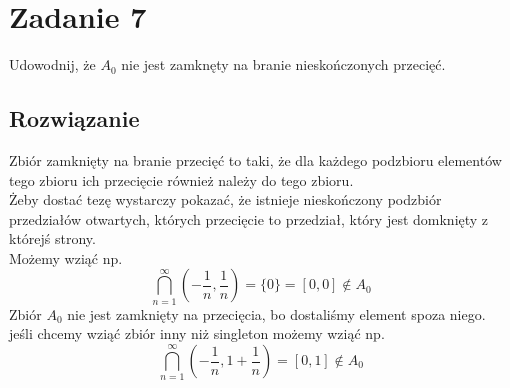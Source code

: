 \section{Zadanie 7}
Udowodnij, że \(A_0\) nie jest zamknęty na branie nieskończonych przecięć.
\subsection*{Rozwiązanie}
Zbiór zamknięty na branie przecięć to taki, że dla każdego podzbioru elementów tego zbioru ich przecięcie również należy do tego zbioru.\\
Żeby dostać tezę wystarczy pokazać, że istnieje nieskończony podzbiór przedziałów otwartych, których przecięcie to przedział, który jest domknięty z którejś strony.\\
Możemy wziąć np.
\[\bigcap_{n=1}^\infty \left(-\frac{1}{n},\frac{1}{n}\right)=\{0\}=[0,0] \notin A_0\]
Zbiór \(A_0\) nie jest zamknięty na przecięcia, bo dostaliśmy element spoza niego.\\
jeśli chcemy wziąć zbiór inny niż singleton możemy wziąć np.
\[\bigcap_{n=1}^\infty \left(-\frac{1}{n},1+\frac{1}{n}\right)=[0,1]  \notin A_0\]